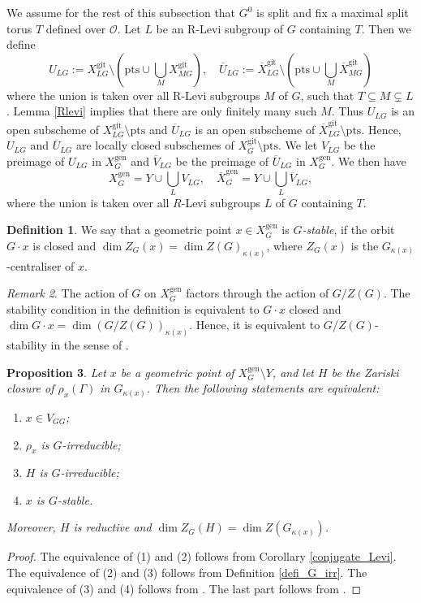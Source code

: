 \documentclass{amsart}
\newtheorem{prop}{Proposition}[section]
\theoremstyle{definition}
\newtheorem{defi}[prop]{Definition}
\theoremstyle{remark}
\newtheorem{remar}[prop]{Remark}
\newcommand{\Vbar}{\overline{{V}}}
\newcommand{\OO}{\mathcal O}
\newcommand{\gen}{\mathrm{gen}}
\newcommand{\gps}{\mathrm{git}}
\newcommand{\Xbar}{\overline{X}}
\newcommand{\XgenG}{X^{\gen}_G}
\newcommand{\XbargenG}{\overline{X}^{\gen}_G}
\newcommand{\pts}{\mathrm{pts}}
\newcommand{\Ubar}{\overline{U}}
\begin{document}
We assume for the rest of this subsection that $G^0$ is split and fix a maximal split torus $T$ 
defined over $\OO$. Let $L$ be an R-Levi subgroup of $G$ containing $T$. Then we define
$$U_{LG}:=X^{\gps}_{LG} \setminus ( \pts \cup \bigcup_{M} X^{\gps}_{MG}),\quad \Ubar_{LG}:=\Xbar^{\gps}_{LG} \setminus ( \pts \cup \bigcup_{M} \Xbar^{\gps}_{MG})$$
where the union is taken over all R-Levi subgroups $M$ of $G$, such that $T\subseteq M \subsetneq L$. Lemma \ref{Rlevi} implies that there are only finitely many such $M$. Thus $U_{LG}$ is 
an open subscheme of $X^{\gps}_{LG} \setminus \pts$ and  $\Ubar_{LG}$ is 
an open subscheme of $\Xbar^{\gps}_{LG} \setminus \pts$. Hence, $U_{LG}$ and $\Ubar_{LG}$ are  locally closed
subschemes of $X^{\gps}_G\setminus \pts$.  We let $V_{LG}$ be the preimage of $U_{LG}$ 
in $\XgenG$ and $\Vbar_{LG}$ be the preimage of $\Ubar_{LG}$ 
in $\XgenG$. We then have 
\begin{equation} 
\XgenG= Y \cup \bigcup_{L} V_{LG}, \quad \XbargenG= Y\cup \bigcup_{L} \overline{V}_{LG},
\end{equation} 
where the union is taken over all $R$-Levi subgroups $L$ of $G$ containing $T$.


\begin{defi} We say that a geometric point $x\in X^{\gen}_G$ is \emph{$G$-stable}, if 
the orbit $G\cdot x$ is closed and $\dim Z_G(x) = \dim Z(G)_{\kappa(x)}$, where $Z_G(x)$ is the $G_{\kappa(x)}$-centraliser of $x$. 
\end{defi}

\begin{remar} The action of $G$ on $X^{\gen}_G$ factors through the action of $G/Z(G)$. The 
stability condition in the definition is equivalent to $G\cdot x$ closed and 
$\dim G\cdot x = \dim 
(G/Z(G))_{\kappa(x)}$. Hence, it is equivalent to $G/Z(G)$-stability in the sense of  \cite[Definition 1]{seshadri}.
\end{remar} 

\begin{prop}\label{irr=stable} Let $x$ be a geometric point of $X^{\gen}_G\setminus Y$, and let $H$ be 
the Zariski closure of $\rho_x(\Gamma)$ in $G_{\kappa(x)}$. 
Then the following statements are equivalent:
\begin{enumerate}
\item $x\in V_{GG}$;
\item $\rho_x$ is $G$-irreducible;
\item $H$ is $G$-irreducible;
\item $x$ is $G$-stable.
\end{enumerate}
Moreover, $H$ is reductive and $\dim Z_G(H)= \dim Z(G_{\kappa(x)})$. 
\end{prop}
\begin{proof} 
The equivalence of (1) and (2) follows from Corollary  \ref{conjugate_Levi}. The equivalence
of (2) and (3) follows from Definition \ref{defi_G_irr}. The equivalence of 
(3) and (4) follows from \cite[Proposition 16.7]{Richardson1988ConjugacyCO}. The last part 
follows from \cite[Lemma 6.2]{martin}.
\end{proof}
\end{document}
